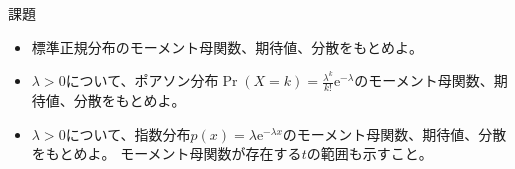 \documentclass[lualatex,handout]{beamer}
\theoremstyle{definition}
\begin{document}
\begin{frame}{課題}
\begin{itemize}
\setlength{\itemsep}{2em}
\item 標準正規分布のモーメント母関数、期待値、分散をもとめよ。
\item $\lambda>0$について、ポアソン分布$\Pr(X=k)=\frac{\lambda^k}{k!}\mathrm{e}^{-\lambda}$のモーメント母関数、期待値、分散をもとめよ。
\item $\lambda>0$について、指数分布$p(x)=\lambda\mathrm{e}^{-\lambda x}$のモーメント母関数、期待値、分散をもとめよ。
モーメント母関数が存在する$t$の範囲も示すこと。
\end{itemize}
\end{frame}
\end{document}
